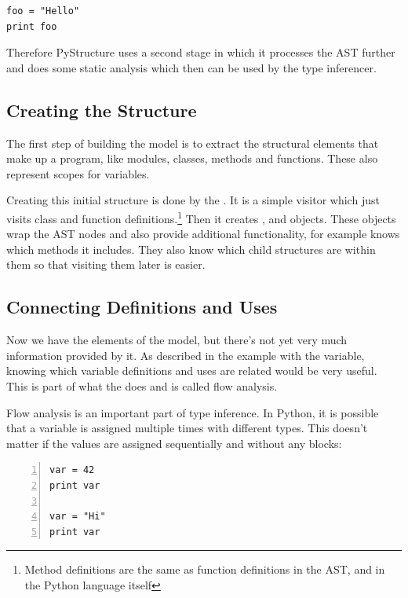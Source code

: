 \documentclass[12pt,halfparskip,DIV11,BCOR10mm]{scrreprt}
\begin{document}
\begin{lstlisting}
foo = "Hello"
print foo
\end{lstlisting}

Therefore PyStructure uses a second stage in which it processes the AST further and does some static analysis which then can be used by the type inferencer.


\subsection{Creating the Structure}

The first step of building the model is to extract the structural elements that make up a program, like modules, classes, methods and functions. These also represent scopes for variables.

Creating this initial structure is done by the . It is a simple visitor which just visits class and function definitions.\footnote{Method definitions are the same as function definitions in the AST, and in the Python language itself} Then it creates ,  and  objects. These objects wrap the AST nodes and also provide additional functionality, for example  knows which methods it includes. They also know which child structures are within them so that visiting them later is easier.

\subsection{Connecting Definitions and Uses}

Now we have the elements of the model, but there's not yet very much information provided by it. As described in the example with the  variable, knowing which variable definitions and uses are related would be very useful. This is part of what the  does and is called flow analysis.

Flow analysis is an important part of type inference. In Python, it is possible that a variable is assigned multiple times with different types. This doesn't matter if the values are assigned sequentially and without any  blocks:

\begin{lstlisting}[numbers=left]
var = 42
print var

var = "Hi"
print var
\end{lstlisting}
\end{document}
